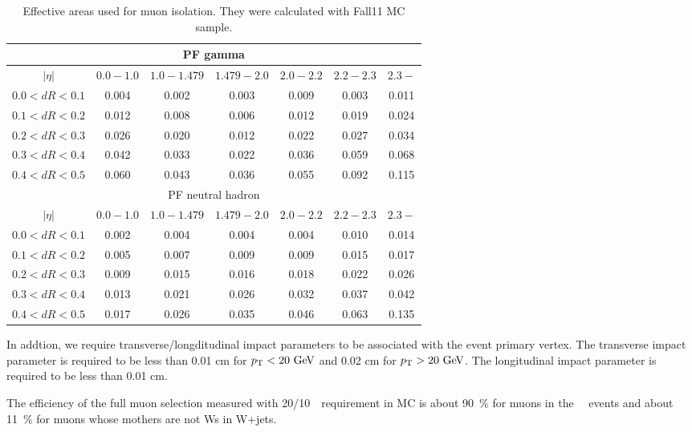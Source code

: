 \begin{table}[htp]
	\centering
		\begin{tabular}{c|c|c|c|c|c|c}
			\hline 
				\multicolumn{7}{c}{PF gamma} \\
	  	    \hline
			 	$|\eta|$     & $0.0 - 1.0$ & $1.0 - 1.479$ & $1.479 - 2.0$ & $2.0 - 2.2$ & $2.2 - 2.3$ & $2.3-$ \\       		
	  	    \hline \hline
				$0.0<dR<0.1$ & 0.004& 0.002& 0.003& 0.009& 0.003& 0.011 \\
				$0.1<dR<0.2$ & 0.012& 0.008& 0.006& 0.012& 0.019& 0.024 \\
				$0.2<dR<0.3$ & 0.026& 0.020& 0.012& 0.022& 0.027& 0.034 \\
				$0.3<dR<0.4$ & 0.042& 0.033& 0.022& 0.036& 0.059& 0.068 \\
				$0.4<dR<0.5$ & 0.060& 0.043& 0.036& 0.055& 0.092& 0.115 \\
	  	    \hline \hline 
				\multicolumn{7}{c}{PF neutral hadron} \\
	  	    \hline 
			 	$|\eta|$     & $0.0 - 1.0$ & $1.0 - 1.479$ & $1.479 - 2.0$ & $2.0 - 2.2$ & $2.2 - 2.3$ & $2.3-$ \\       		
	  	    \hline \hline
				$0.0<dR<0.1$ & 0.002& 0.004& 0.004& 0.004& 0.010& 0.014 \\
			    $0.1<dR<0.2$ & 0.005& 0.007& 0.009& 0.009& 0.015& 0.017 \\
			    $0.2<dR<0.3$ & 0.009& 0.015& 0.016& 0.018& 0.022& 0.026 \\ 
				$0.3<dR<0.4$ & 0.013& 0.021& 0.026& 0.032& 0.037& 0.042 \\ 
				$0.4<dR<0.5$ & 0.017& 0.026& 0.035& 0.046& 0.063& 0.135 \\ 
			\hline
		\end{tabular}
		\caption{ Effective areas used for muon isolation. They were calculated with Fall11 MC sample.}
	\label{tab:muAeff}
\end{table}

In addtion, we require transverse/longditudinal impact parameters 
to be associated with the event primary vertex. 
The transverse impact parameter is required 
to be less than 0.01 cm for $p_\mathrm{T}<20~\mathrm{Ge\kern -0.1em V}$ and 0.02 cm for $p_\mathrm{T}>20~\mathrm{Ge\kern -0.1em V}$. 
The longitudinal impact parameter is required to be less than 0.01 cm. 

The efficiency of the full muon selection measured with 20/10~\GeV\ requirement 
in MC is about 90~\% for muons in the ~\GeV\ events 
and about 11~\% for muons whose mothers are not Ws in W+jets.


